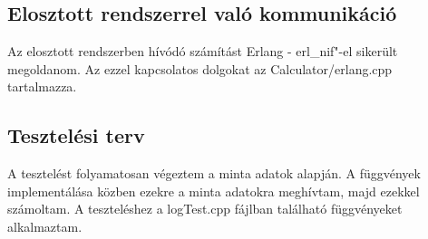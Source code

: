 \subsection{Elosztott rendszerrel való kommunikáció}
Az elosztott rendszerben hívódó számítást Erlang - erl\_nif"-el sikerült megoldanom. 
Az ezzel kapcsolatos dolgokat az Calculator/erlang.cpp tartalmazza. 
\subsection{Tesztelési terv}
A tesztelést folyamatosan végeztem a minta adatok alapján. A függvények implementálása közben ezekre a minta adatokra meghívtam, majd ezekkel számoltam. A teszteléshez a logTest.cpp fájlban található függvényeket alkalmaztam. 